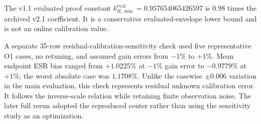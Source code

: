 The v1.1 evaluated proof constant $k_{R,\min}^{\mathrm{eval}}=0.957654065426597$ is $0.98$ times the archived v2.1 coefficient. It is a conservative evaluated-envelope lower bound and is not an online calibration value.

A separate 35-row residual-calibration-sensitivity check used five representative O1 cases, no retuning, and assumed gain errors from $-1\%$ to $+1\%$. Mean endpoint ESR bias ranged from $+1.0225\%$ at $-1\%$ gain error to $-0.9779\%$ at $+1\%$; the worst absolute case was $1.1708\%$. Unlike the casewise $\pm0.006$ variation in the main evaluation, this check represents residual unknown calibration error. It follows the inverse-scale relation while retaining finite observation noise. The later full rerun adopted the reproduced center rather than using the sensitivity study as an optimization.
